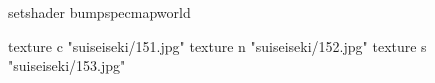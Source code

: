 setshader bumpspecmapworld

    texture c "suiseiseki/151.jpg"
    texture n "suiseiseki/152.jpg"
    texture s "suiseiseki/153.jpg"
